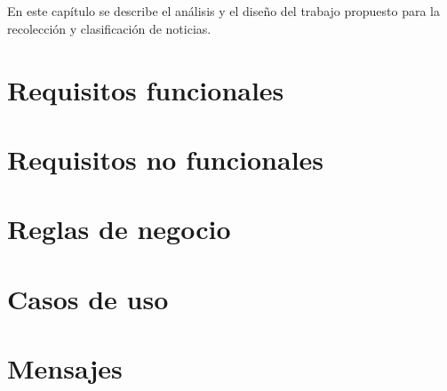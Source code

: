 \ \\\\
En este capítulo se describe el análisis y el diseño del trabajo propuesto para
la recolección y clasificación de noticias.

\section[Requisitos f.]{Requisitos funcionales}


\section[Requisitos no f.]{Requisitos no funcionales}


\section{Reglas de negocio}



\newpage
\section{Casos de uso}



{\setlength{\parindent}{0pt}%
  
  \newpage
  

  
  \newpage
  
  \newpage
}


\section{Mensajes}


